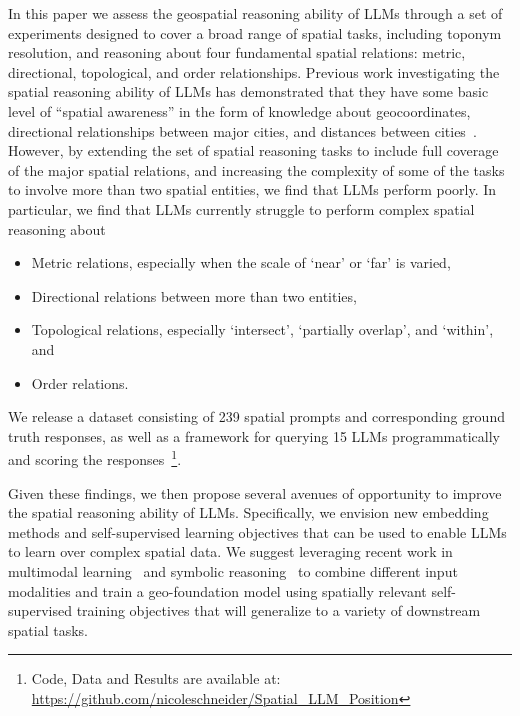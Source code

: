 In this paper we assess the geospatial reasoning ability of LLMs through a set of experiments designed to cover a broad range of spatial tasks, including toponym resolution, and reasoning about four fundamental spatial relations: metric, directional, topological, and order relationships.
Previous work investigating the spatial reasoning ability of LLMs has demonstrated that they have some basic level of ``spatial awareness'' in the form of knowledge about geocoordinates, directional relationships between major cities, and distances between cities~\cite{Bhandari2023, Qi2023}.
However, by extending the set of spatial reasoning tasks to include full coverage of the major spatial relations, and increasing the complexity of some of the tasks to involve more than two spatial entities, we find that LLMs perform poorly.
In particular, we find that LLMs currently struggle to perform complex spatial reasoning about

\begin{itemize}
    \item Metric relations, especially when the scale of `near' or `far' is varied,
    \item Directional relations between more than two entities, 
    \item Topological relations, especially `intersect', `partially overlap', and `within', and
    \item Order relations.
\end{itemize}

\noindent We release a dataset consisting of 239 spatial prompts and corresponding ground truth responses, as well as a framework for querying 15 LLMs programmatically and scoring the responses~\footnote{Code, Data and Results are available at: \url{https://github.com/nicoleschneider/Spatial_LLM_Position}}. 


Given these findings, we then propose several avenues of opportunity to improve the spatial reasoning ability of LLMs.
Specifically, we envision new embedding methods and self-supervised learning objectives that can be used to enable LLMs to learn over complex spatial data.
We suggest leveraging recent work in multimodal learning~\cite{Xue2023, Trappolini2023} and symbolic reasoning~\cite{Lee2023} to combine different input modalities and train a geo-foundation model using spatially relevant self-supervised training objectives that will generalize to a variety of downstream spatial tasks.

